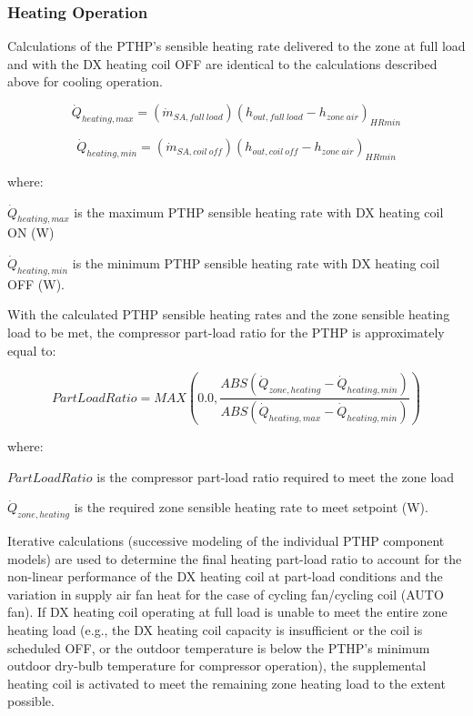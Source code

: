 \subsubsection{Heating Operation}\label{heating-operation-1-000}

Calculations of the PTHP's sensible heating rate delivered to the zone at full load and with the DX heating coil OFF are identical to the calculations described above for cooling operation.

\begin{equation}
  \dot{Q}_{heating,max} = \left( \dot{m}_{SA,full~load} \right) \left( h_{out,full~load} - h_{zone~air} \right)_{HRmin}
\end{equation}

\begin{equation}
  \dot{Q}_{heating,min} = \left( \dot{m}_{SA,coil~off} \right) \left( h_{out,coil~off} - h_{zone~air} \right)_{HRmin}
\end{equation}

where:

\(\dot{Q}_{heating,max}\) is the maximum PTHP sensible heating rate with DX heating coil ON (W)

\(\dot{Q}_{heating,min}\) is the minimum PTHP sensible heating rate with DX heating coil OFF (W).

With the calculated PTHP sensible heating rates and the zone sensible heating load to be met, the compressor part-load ratio for the PTHP is approximately equal to:

\begin{equation}
  PartLoadRatio = MAX \left( 0.0, \frac{ABS \left( \dot{Q}_{zone,heating} - \dot{Q}_{heating,min} \right)}{ABS \left( \dot{Q}_{heating,max} - \dot{Q}_{heating,min} \right)} \right)
\end{equation}

where:

\(PartLoadRatio\) is the compressor part-load ratio required to meet the zone load

\(\dot{Q}_{zone,heating}\) is the required zone sensible heating rate to meet setpoint (W).

Iterative calculations (successive modeling of the individual PTHP component models) are used to determine the final heating part-load ratio to account for the non-linear performance of the DX heating coil at part-load conditions and the variation in supply air fan heat for the case of cycling fan/cycling coil (AUTO fan). If DX heating coil operating at full load is unable to meet the entire zone heating load (e.g., the DX heating coil capacity is insufficient or the coil is scheduled OFF, or the outdoor temperature is below the PTHP's minimum outdoor dry-bulb temperature for compressor operation), the supplemental heating coil is activated to meet the remaining zone heating load to the extent possible.

